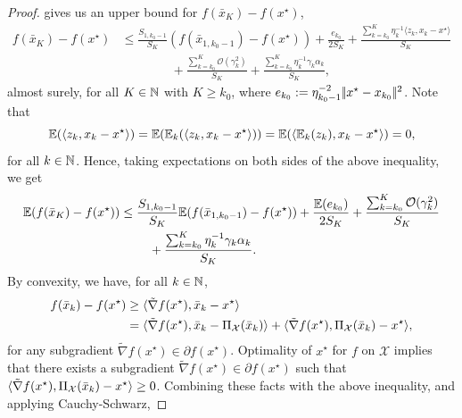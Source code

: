 \begin{proof}
     gives us
    an upper bound for $f(\bar{x}_K) - f(x^\star)$,
    \begin{align*}
        f(\bar{x}_K) - f(x^\star)
        &\leq
        \frac{S_{1, k_0-1}}{S_K} (f(\bar{x}_{1, k_0-1}) - f(x^\star))
        +
        \frac{e_{k_0}}{2S_K}
            + \frac{\sum_{k=k_0}^K \eta_k^{-1}\langle z_k, x_k - x^\star \rangle}{S_K} \\
        &\phantom{===} + \frac{\sum_{k=k_0}^{K} \mathcal{O}(\gamma_k^2)}{S_K}
            + \frac{\sum_{k=k_0}^{K}\eta_k^{-1}\gamma_k\alpha_k}{S_K},
    \end{align*}
    almost surely, for all $K\in\mathbb{N}$ with $K \geq k_0$, where
    $e_{k_0} := \eta_{k_0-1}^{-2} |\!|x^\star - x_{k_0}|\!|^2$. Note that
    \[
        \mathbb{E}(\langle z_k, x_k - x^\star \rangle)
        = \mathbb{E}(\mathbb{E}_k(\langle z_k, x_k - x^\star \rangle))
        = \mathbb{E}(\langle \mathbb{E}_k(z_k), x_k - x^\star \rangle)
        = 0,
    \]
    for all $k\in\mathbb{N}$. Hence, taking expectations on both sides of the above inequality, we get
    \begin{align}
        \label{eq:proof:cor:convergence-rates-in-expectation-0}
        \mathbb{E}(f(\bar{x}_K) - f(x^\star))
        &\leq
        \frac{S_{1, k_0-1}}{S_K} \mathbb{E}(f(\bar{x}_{1, k_0-1}) - f(x^\star))
        +
        \frac{\mathbb{E}(e_{k_0})}{2S_K}
        +
        \frac{\sum_{k=k_0}^{K} \mathcal{O}(\gamma_k^2)}{S_K} \\
        &\phantom{===} + \frac{\sum_{k=k_0}^{K}\eta_k^{-1}\gamma_k\alpha_k}{S_K}. \notag
    \end{align}
    By convexity, we have, for all $k\in\mathbb{N}$,
    \begin{align*}
        f(\bar{x}_k) - f(x^\star) &\geq \langle \tilde{\nabla} f(x^\star), \bar{x}_k - x^\star \rangle \\
                            &= \langle \tilde{\nabla} f(x^\star), \bar{x}_k - \operatorname{\Pi_\mathcal{X}}(\bar{x}_k) \rangle
                                + \langle \tilde{\nabla} f(x^\star), \operatorname{\Pi_\mathcal{X}}(\bar{x}_k) - x^\star \rangle,
    \end{align*}
    for any subgradient $\tilde{\nabla} f(x^\star) \in \partial f(x^\star)$. Optimality of $x^\star$
    for $f$ on $\mathcal{X}$ implies that there exists a subgradient
    $\tilde{\nabla} f(x^\star) \in \partial f(x^\star)$ such that
    $\langle \tilde{\nabla} f(x^\star), \operatorname{\Pi_\mathcal{X}}(\bar{x}_k) - x^\star \rangle \geq 0$.
    Combining these facts with the above inequality, and applying Cauchy-Schwarz,

\end{proof}
